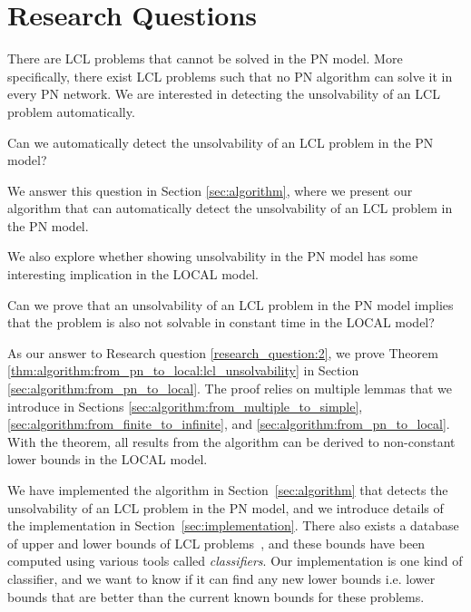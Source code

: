 
\section{Research Questions} \label{sec:research_question}

There are LCL problems that cannot be solved in the PN model.
More specifically, there exist LCL problems such that no PN algorithm can solve it in every PN network.
We are interested in detecting the unsolvability of an LCL problem automatically.

\begin{researchquestion} \label{research_question:1}
Can we automatically detect the unsolvability of an LCL problem in the PN model?
\end{researchquestion}

We answer this question in Section \ref{sec:algorithm}, where we present our algorithm that can automatically detect the unsolvability of an LCL problem in the PN model.

We also explore whether showing unsolvability in the PN model has some interesting implication in the LOCAL model.

\begin{researchquestion} \label{research_question:2}
Can we prove that an unsolvability of an LCL problem in the PN model implies that the problem is also not solvable in constant time in the LOCAL model?
\end{researchquestion}

As our answer to Research question \ref{research_question:2}, we prove Theorem \ref{thm:algorithm:from_pn_to_local:lcl_unsolvability} in Section \ref{sec:algorithm:from_pn_to_local}.
The proof relies on multiple lemmas that we introduce in Sections \ref{sec:algorithm:from_multiple_to_simple}, \ref{sec:algorithm:from_finite_to_infinite}, and \ref{sec:algorithm:from_pn_to_local}.
With the theorem, all results from the algorithm can be derived to non-constant lower bounds in the LOCAL model.

We have implemented the algorithm in Section~\ref{sec:algorithm} that detects the unsolvability of an LCL problem in the PN model, and we introduce details of the implementation in Section~\ref{sec:implementation}.
There also exists a database of upper and lower bounds of LCL problems~\cite{Tereshchenko2021}, and these bounds have been computed using various tools called \emph{classifiers}.
Our implementation is one kind of classifier, and we want to know if it can find any new lower bounds i.e. lower bounds that are better than the current known bounds for these problems.

